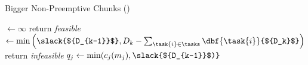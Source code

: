 \begin{algorithm}[h]
  \caption{Bigger Non-Preemptive Chunks (\bng{})}\label{alg:bng}
  \begin{algorithmic}[1]
    \State {} ${\gets \infty}$
        \State return \emph{feasible}
      \EndIf
      \State {} ${\gets \min
        \left(
          \slack{${D_{k-1}}$}, D_k - \sum_{\task{i} \in \tasks}
          \dbf{\task{i}}{${D_k}$}
        \right)
        }$
        \State return \emph{infeasible}
      \EndIf
          \State ${q_j \gets \min(c_j(m_j), \slack{${D_{k-1}}$)}}$
          \label{line:bng-improvement}
      \EndFor
    \EndFor
  \end{algorithmic}
\end{algorithm}

